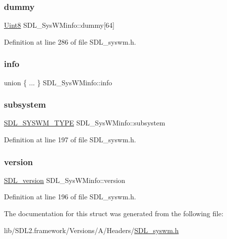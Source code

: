 \subsubsection{\texorpdfstring{dummy}{dummy}}
{\footnotesize\ttfamily \mbox{\hyperlink{_s_d_l__stdinc_8h_a2944638813a090aa23e62f4da842c3e2}{Uint8}} S\+D\+L\+\_\+\+Sys\+W\+Minfo\+::dummy\mbox{[}64\mbox{]}}



Definition at line 286 of file S\+D\+L\+\_\+syswm.\+h.

\mbox{\label{struct_s_d_l___sys_w_minfo_a4e90cf02d24a53a9305948e167df83c6}} 
\subsubsection{\texorpdfstring{info}{info}}
{\footnotesize\ttfamily union \{ ... \}   S\+D\+L\+\_\+\+Sys\+W\+Minfo\+::info}

\mbox{\label{struct_s_d_l___sys_w_minfo_a438b6a06ab3ee417293c7b7fc5a23855}} 
\subsubsection{\texorpdfstring{subsystem}{subsystem}}
{\footnotesize\ttfamily \mbox{\hyperlink{_s_d_l__syswm_8h_a064c26598287280fff2a00d6758ac4f7}{S\+D\+L\+\_\+\+S\+Y\+S\+W\+M\+\_\+\+T\+Y\+PE}} S\+D\+L\+\_\+\+Sys\+W\+Minfo\+::subsystem}



Definition at line 197 of file S\+D\+L\+\_\+syswm.\+h.

\mbox{\label{struct_s_d_l___sys_w_minfo_ac3a70af022d4849e9ff546595e94627f}} 
\subsubsection{\texorpdfstring{version}{version}}
{\footnotesize\ttfamily \mbox{\hyperlink{struct_s_d_l__version}{S\+D\+L\+\_\+version}} S\+D\+L\+\_\+\+Sys\+W\+Minfo\+::version}



Definition at line 196 of file S\+D\+L\+\_\+syswm.\+h.



The documentation for this struct was generated from the following file\+:\begin{DoxyCompactItemize}
\item 
lib/\+S\+D\+L2.\+framework/\+Versions/\+A/\+Headers/\mbox{\hyperlink{_s_d_l__syswm_8h}{S\+D\+L\+\_\+syswm.\+h}}\end{DoxyCompactItemize}
